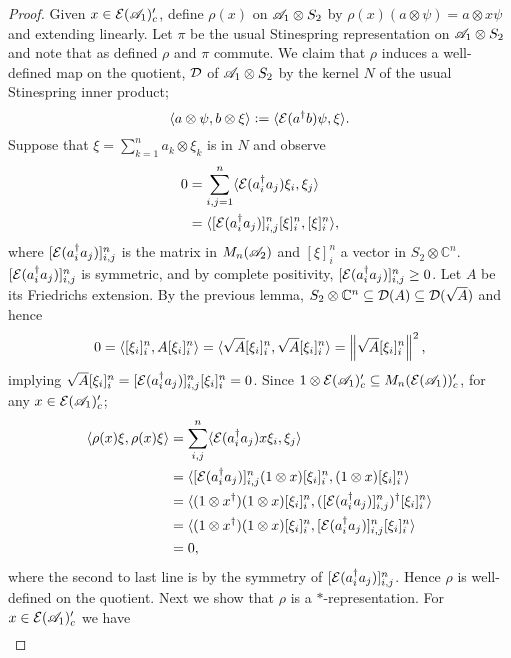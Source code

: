 \documentclass[12pt]{article}
\begin{document}
\begin{proof}
	
	Given $x \in \mathcal{E}(\mathscr{A}_1)'_c$, define $\rho(x)$ on $\mathscr{A}_1 \otimes S_2$ by $\rho(x)(a \otimes \psi) = a \otimes x\psi$ and extending linearly.
	Let $\pi$ be the usual Stinespring representation on $\mathscr{A}_1 \otimes S_2$ and note that as defined $\rho$ and $\pi$ commute.
	We claim that $\rho$ induces a well-defined map on the quotient, $\mathcal{D}$ of $\mathscr{A}_1 \otimes S_2$ by the kernel $N$ of the usual Stinespring inner product;
	$$\langle a \otimes \psi, b \otimes \xi \rangle \vcentcolon= \langle \mathcal{E}(a^\dagger b)\psi, \xi \rangle.$$
	Suppose that $\xi = \sum_{k = 1}^n a_k \otimes \xi_k$ is in $N$ and observe
	\begin{align*}
		0 &= \sum_{i, j = 1}^n \langle \mathcal{E}(a_i^\dagger a_j)\xi_i, \xi_j \rangle \\
		  &= \langle [\mathcal{E}(a_i^\dagger a_j)]_{i,j}^n[\xi]_{i}^n, [\xi]_{i}^n \rangle,
	\end{align*}
	where $[\mathcal{E}(a_i^\dagger a_j)]_{i,j}^n$ is the matrix in $M_n(\mathscr{A}_2)$ and $[\xi]_i^n$ a vector in $S_2 \otimes \mathbb{C}^n$. 
	$[\mathcal{E}(a_i^\dagger a_j)]_{i,j}^n$ is symmetric, and by complete positivity, $[\mathcal{E}(a_i^\dagger a_j)]_{i,j}^n \ge 0$. 
	Let $A$ be its Friedrichs extension. By the previous lemma, $S_2 \otimes \mathbb{C}^n \subseteq \mathcal{D}(A) \subseteq \mathcal{D}(\sqrt{A})$
	and hence $$0 = \langle [\xi_i]_i^n, A [\xi_i]_i^n \rangle = \langle \sqrt{A}[\xi_i]_i^n, \sqrt{A}[\xi_i]_i^n \rangle = \left\lVert\sqrt{A}[\xi_i]_i^n\right\rVert^2,$$
	implying $\sqrt{A}[\xi_i]_i^n = [\mathcal{E}(a_i^\dagger a_j)]_{i,j}^n[\xi_i]_i^n = 0$. Since $1 \otimes \mathcal{E}(\mathscr{A}_1)'_c \subseteq M_n(\mathcal{E}(\mathscr{A}_1))'_c$,
	for any $x \in \mathcal{E}(\mathscr{A}_1)'_c$; 
	\begin{align*}
		\langle \rho(x)\xi, \rho(x)\xi \rangle &= \sum_{i,j}^n \langle \mathcal{E}(a_i^\dagger a_j)x\xi_i, \xi_j \rangle \\
					    &= \langle [\mathcal{E}(a_i^\dagger a_j)]_{i,j}^n(1 \otimes x)[\xi_i]_i^n, (1 \otimes x)[\xi_i]_i^n \rangle \\
					    &= \langle (1 \otimes x^\dagger)(1 \otimes x)[\xi_i]_i^n, ([\mathcal{E}(a_i^\dagger a_j)]_{i,j}^n)^\dagger[\xi_i]_i^n \rangle \\
					    &= \langle (1 \otimes x^\dagger)(1 \otimes x)[\xi_i]_i^n, [\mathcal{E}(a_i^\dagger a_j)]_{i,j}^n[\xi_i]_i^n \rangle \\ 
					    &= 0,
	\end{align*}
	where the second to last line is by the symmetry of $[\mathcal{E}(a_i^\dagger a_j)]_{i,j}^n$. Hence $\rho$ is well-defined on the quotient. 
	Next we show that $\rho$ is a $*$-representation. For $x \in \mathcal{E}(\mathscr{A}_1)'_c$ we have 
	\begin{align*}

\end{align*}
\end{proof}
\end{document}
